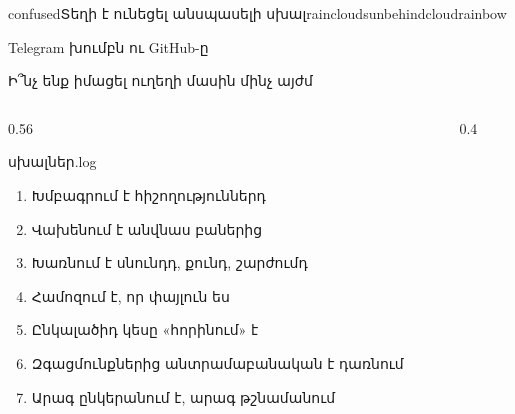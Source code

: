 
%
  {    }%
  {confused}{Տեղի է ունեցել անսպասելի սխալ}{{raincloud}{sunbehindcloud}{rainbow}}

\begin{frame}{Telegram խումբն ու GitHub-ը}
  \telegramframebody
\end{frame}

\begin{frame}{Ի՞նչ ենք իմացել ուղեղի մասին մինչ այժմ}
  \begin{columns}[c]
    \begin{column}{0.56\textwidth}
      \begin{popup}{սխալներ.log}
        \small
        \begin{enumerate}\setlength{\itemsep}{0.2mm}
          \item Խմբագրում է հիշողություններդ
          \item Վախենում է անվնաս բաներից
          \item Խառնում է սնունդդ, քունդ, շարժումդ
          \item Համոզում է, որ փայլուն ես
          \item Ընկալածիդ կեսը «հորինում» է
          \item Զգացմունքներից անտրամաբանական է դառնում
          \item Արագ ընկերանում է, արագ թշնամանում
        \end{enumerate}
      \end{popup}
    \end{column}
    \begin{column}{0.4\textwidth}
      \vspace{1mm}
    \end{column}
  \end{columns}
\end{frame}

